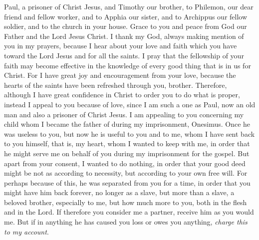 
\begin{biblechapter} %
 Paul, a prisoner of Christ Jesus, and Timothy our brother, to Philemon, our dear friend and fellow worker,
\verse and to Apphia our sister, and to Archippus our fellow soldier, and to the church in your house.
\verse Grace to you and peace from God our Father and the Lord Jesus Christ.
 I thank my God, always making mention of you in my prayers,
\verse because I hear about your love and faith which you have toward the Lord Jesus and for all the saints.
\verse I pray that the fellowship of your faith may become effective in the knowledge of every good thing that is in us for Christ.
\verse For I have great joy and encouragement from your love, because the hearts of the saints have been refreshed through you, brother.
 Therefore, although I have great confidence in Christ to order you to do what is proper,
\verse instead I appeal to you because of love, since I am such a one as Paul, now an old man and also a prisoner of Christ Jesus.
\verse I am appealing to you concerning my child whom I became the father of during my imprisonment, Onesimus.
\verse Once he was useless to you, but now he is useful to you and to me,
\verse whom I have sent back to you himself, that is, my heart,
\verse whom I wanted to keep with me, in order that he might serve me on behalf of you during my imprisonment for the gospel.
\verse But apart from your consent, I wanted to do nothing, in order that your good deed might be not as according to necessity, but according to your own free will.
\verse For perhaps because of this, he was separated from you for a time, in order that you might have him back forever,
\verse no longer as a slave, but more than a slave, a beloved brother, especially to me, but how much more to you, both in the flesh and in the Lord.
 If therefore you consider me a partner, receive him as you would me.
\verse But if in anything he has caused you loss or owes you anything, \textit{charge this to my account}.

\end{biblechapter}
